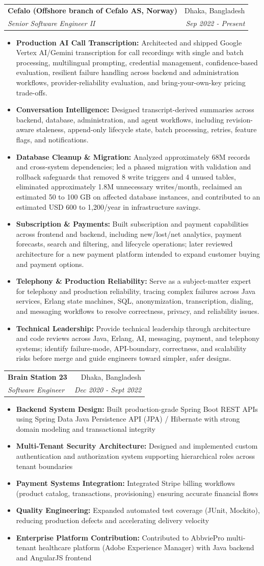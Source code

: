 \documentclass[letterpaper,11pt]{article}
\makeatletter
\newcommand{\resumeItem}[1]{
  \item\small{#1 \vspace{-2pt}}
}
\newcommand{\resumeSubheading}[4]{
  \vspace{-2pt}\item
    \begin{tabular*}{0.97\textwidth}[t]{l@{\extracolsep{\fill}}r}
      \textbf{#1} & #2 \\
      \textit{\small#3} & \textit{\small #4} \\
    \end{tabular*}\vspace{-6pt}
}
\newcommand{\resumeItemListStart}{\begin{itemize}}
\newcommand{\resumeItemListEnd}{\end{itemize}\vspace{-5pt}}
\makeatother
\begin{document}
\resumeSubheading
{Cefalo (Offshore branch of Cefalo AS, Norway)}{Dhaka, Bangladesh}
{Senior Software Engineer II}{Sep 2022 - Present}
\resumeItemListStart
\resumeItem{\textbf{Production AI Call Transcription:} Architected and shipped Google Vertex AI/Gemini transcription for call recordings with single and batch processing, multilingual prompting, credential management, confidence-based evaluation, resilient failure handling across backend and administration workflows, provider-reliability evaluation, and bring-your-own-key pricing trade-offs.}
\resumeItem{\textbf{Conversation Intelligence:} Designed transcript-derived summaries across backend, database, administration, and agent workflows, including revision-aware staleness, append-only lifecycle state, batch processing, retries, feature flags, and notifications.}
\resumeItem{\textbf{Database Cleanup \& Migration:} Analyzed approximately 68M records and cross-system dependencies; led a phased migration with validation and rollback safeguards that removed 8 write triggers and 4 unused tables, eliminated approximately 1.8M unnecessary writes/month, reclaimed an estimated 50 to 100 GB on affected database instances, and contributed to an estimated USD 600 to 1,200/year in infrastructure savings.}
\resumeItem{\textbf{Subscription \& Payments:} Built subscription and payment capabilities across frontend and backend, including new/lost/net analytics, payment forecasts, search and filtering, and lifecycle operations; later reviewed architecture for a new payment platform intended to expand customer buying and payment options.}
\resumeItem{\textbf{Telephony \& Production Reliability:} Serve as a subject-matter expert for telephony and production reliability, tracing complex failures across Java services, Erlang state machines, SQL, anonymization, transcription, dialing, and messaging workflows to resolve correctness, privacy, and reliability issues.}
\resumeItem{\textbf{Technical Leadership:} Provide technical leadership through architecture and code reviews across Java, Erlang, AI, messaging, payment, and telephony systems; identify failure-mode, API-boundary, correctness, and scalability risks before merge and guide engineers toward simpler, safer designs.}
\resumeItemListEnd

\resumeSubheading
{Brain Station 23}{Dhaka, Bangladesh}
{Software Engineer}{Dec 2020 - Sept 2022}
\resumeItemListStart
\resumeItem{\textbf{Backend System Design:} Built production-grade Spring Boot REST APIs using Spring Data Java Persistence API (JPA) / Hibernate with strong domain modeling and transactional integrity}
\resumeItem{\textbf{Multi-Tenant Security Architecture:} Designed and implemented custom authentication and authorization system supporting hierarchical roles across tenant boundaries}
\resumeItem{\textbf{Payment Systems Integration:} Integrated Stripe billing workflows (product catalog, transactions, provisioning) ensuring accurate financial flows}
\resumeItem{\textbf{Quality Engineering:} Expanded automated test coverage (JUnit, Mockito), reducing production defects and accelerating delivery velocity}
\resumeItem{\textbf{Enterprise Platform Contribution:} Contributed to AbbviePro multi-tenant healthcare platform (Adobe Experience Manager) with Java backend and AngularJS frontend}
\resumeItemListEnd
\end{document}
